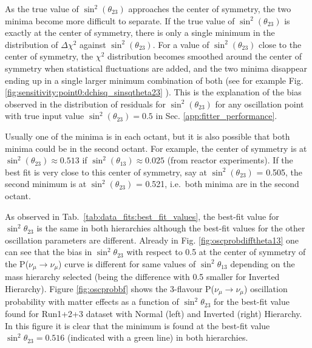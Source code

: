 As the true value of $\sin^{2}(\theta_{23})$ approaches the center of symmetry, the two minima become more difficult to separate.  If the true value of $\sin^{2}(\theta_{23})$ is exactly at the center of symmetry, there is only a single minimum in the distribution of $\Delta \chi^{2}$ against $\sin^{2}(\theta_{23})$. For a value of  $\sin^{2}(\theta_{23})$ close to the center of symmetry, the $\chi^{2}$ distribution becomes smoothed around the center of symmetry when statistical fluctuations are added, and the two minima disappear ending up in a single larger minimum combination of both (see for example Fig. \ref{fig:sensitivity:point0:dchisq_sinsqtheta23} ). This is the explanation of the bias observed in the distribution of residuals for $\sin^{2}(\theta_{23})$ for any oscillation point with true input value $\sin^{2}(\theta_{23}) = 0.5$ in Sec. \ref{app:fitter_performance}.

Usually one of the minima is in each octant, but it is also possible that both minima could be in the second octant. For example, the center of symmetry is at $\sin^{2}(\theta_{23})\approx0.513$ if $\sin^{2}(\theta_{13})\approx 0.025$ (from reactor experiments). If the best fit is very close to this center of symmetry, say at $\sin^{2}(\theta_{23})$ = 0.505, the second minimum is at $\sin^{2}(\theta_{23})$ = 0.521, i.e.\ both minima are in the second octant. 

As observed in Tab.\ \ref{tab:data_fits:best_fit_values}, the best-fit value for $\sin^{2}\theta_{23}$ is the same in both hierarchies 
although the best-fit values for the other oscillation parameters are different.
Already in Fig. \ref{fig:oscprobdifftheta13} one can see that the bias in $\sin^{2}\theta_{23}$ with respect to 0.5 at the center of symmetry of the P($\nu_{\mu}\rightarrow\nu_{\mu}$) curve 
is different for same values of $\sin^{2}\theta_{13}$ depending on the mass hierarchy selected (being the difference with 0.5 smaller for Inverted Hierarchy). 
Figure \ref{fig:oscprobbf} shows the  3-flavour P($\nu_{\mu}\rightarrow\nu_{\mu}$) oscillation probability with matter effects as a function of $\sin^{2}\theta_{23}$ for the best-fit
value found for Run1+2+3 dataset with Normal (left) and Inverted (right) Hierarchy. In this figure it is clear that the minimum is found at the best-fit value $\sin^{2}\theta_{23} = 0.516$
(indicated with a green line) in both hierarchies. 

